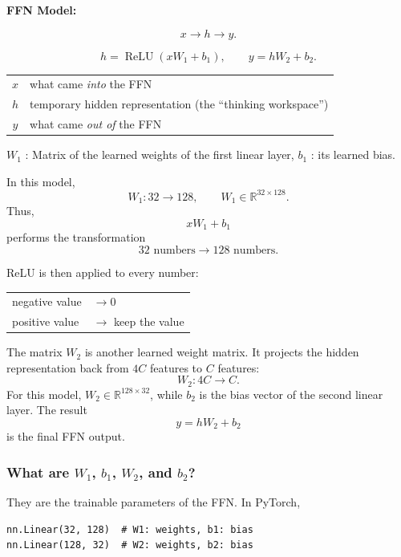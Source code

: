 \textbf{FFN Model:}

\[
  x\longrightarrow h\longrightarrow y.
\]

\[
  h=\operatorname{ReLU}(xW_1+b_1),
  \qquad
  y=hW_2+b_2.
\]

\begin{center}
\begin{tabular}{@{}cl@{}}
  \(x\) & what came \emph{into} the FFN \\
  \(h\) & temporary hidden representation (the ``thinking workspace'') \\
  \(y\) & what came \emph{out of} the FFN
\end{tabular}
\end{center}







\(W_1\) : Matrix of the learned weights of the first linear layer,
\(b_1\) : its learned bias. 

In this model,
\[
  W_1:32\longrightarrow128,
  \qquad
  W_1\in\mathbb{R}^{32\times128}.
\]
Thus,
\[
  xW_1+b_1
\]
performs the transformation
\[
  32\text{ numbers}\longrightarrow128\text{ numbers}.
\]

ReLU is then applied to every number:
\begin{center}
\begin{tabular}{@{}ll@{}}
  negative value & \(\longrightarrow 0\) \\
  positive value & \(\longrightarrow\) keep the value
\end{tabular}
\end{center}

The matrix \(W_2\) is another learned weight matrix. It projects the hidden
representation back from \(4C\) features to \(C\) features:
\[
  W_2:4C\longrightarrow C.
\]
For this model, \(W_2\in\mathbb{R}^{128\times32}\), while \(b_2\) is the
bias vector of the second linear layer. The result
\[
  y=hW_2+b_2
\]
is the final FFN output.

\subsubsection*{What are \(W_1\), \(b_1\), \(W_2\), and \(b_2\)?}

They are the trainable parameters of the FFN. In PyTorch,
\begin{lstlisting}[style=shadedpython]
nn.Linear(32, 128)  # W1: weights, b1: bias
nn.Linear(128, 32)  # W2: weights, b2: bias
\end{lstlisting}

